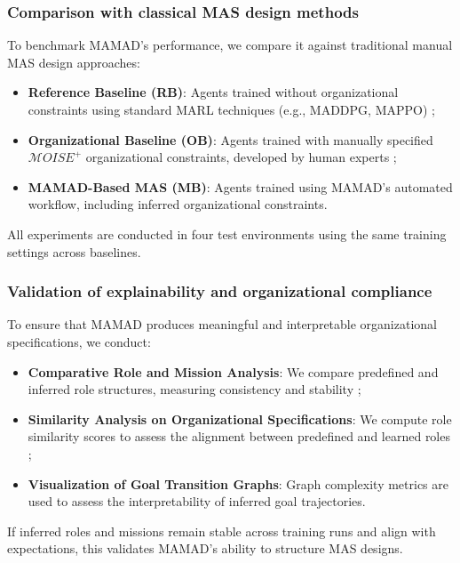 \documentclass[pdflatex,sn-mathphys-num]{sn-jnl}%
\theoremstyle{thmstyleone}%
\theoremstyle{thmstyletwo}%
\theoremstyle{thmstylethree}%
\begin{document}
\subsubsection{Comparison with classical MAS design methods}
To benchmark MAMAD's performance, we compare it against traditional manual MAS design approaches:
\begin{itemize}
    \item \textbf{Reference Baseline (RB)}: Agents trained without organizational constraints using standard MARL techniques (e.g., MADDPG, MAPPO) ;
    \item \textbf{Organizational Baseline (OB)}: Agents trained with manually specified $\mathcal{M}OISE^+$ organizational constraints, developed by human experts ;
    \item \textbf{MAMAD-Based MAS (MB)}: Agents trained using MAMAD's automated workflow, including inferred organizational constraints.
\end{itemize}

All experiments are conducted in four test environments using the same training settings across baselines.

\subsubsection{Validation of explainability and organizational compliance}
To ensure that MAMAD produces meaningful and interpretable organizational specifications, we conduct:
\begin{itemize}
    \item \textbf{Comparative Role and Mission Analysis}: We compare predefined and inferred role structures, measuring consistency and stability ;
    \item \textbf{Similarity Analysis on Organizational Specifications}: We compute role similarity scores to assess the alignment between predefined and learned roles ;
    \item \textbf{Visualization of Goal Transition Graphs}: Graph complexity metrics are used to assess the interpretability of inferred goal trajectories.
\end{itemize}

If inferred roles and missions remain stable across training runs and align with expectations, this validates MAMAD's ability to structure MAS designs.
\end{document}
